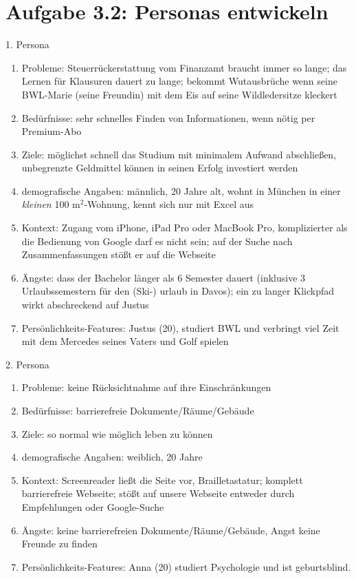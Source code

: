 \documentclass{article}
\begin{document}
	\section*{Aufgabe 3.2: Personas entwickeln}
	1. Persona
	 \begin{enumerate}[label=(\alph*)]
	 	\item Probleme: Steuerrückerstattung vom Finanzamt braucht immer so lange; das Lernen für Klausuren dauert zu lange; bekommt Wutausbrüche wenn seine BWL-Marie (seine Freundin) mit dem Eis auf seine Wildledersitze kleckert
	 	\item Bedürfnisse: sehr schnelles Finden von Informationen, wenn nötig per Premium-Abo
	 	\item Ziele: möglichst schnell das Studium mit minimalem Aufwand abschließen, unbegrenzte Geldmittel können in seinen Erfolg investiert werden
	 	\item demografische Angaben: männlich, 20 Jahre alt, wohnt in München in einer \textit{kleinen} 100 m$^2$-Wohnung, kennt sich nur mit Excel aus
	 	\item Kontext: Zugang vom iPhone, iPad Pro oder MacBook Pro, komplizierter als die Bedienung von Google darf es nicht sein; auf der Suche nach Zusammenfassungen stößt er auf die Webseite
	 	\item Ängste: dass der Bachelor länger als 6 Semester dauert (inklusive 3 Urlaubssemestern für den (Ski-) urlaub in Davos); ein zu langer Klickpfad wirkt abschreckend auf Justus
	 	\item Persönlichkeits-Features: Justus (20), studiert BWL und verbringt viel Zeit mit dem Mercedes seines Vaters und Golf spielen
	 \end{enumerate}
 	2. Persona
 	\begin{enumerate}[label=(\alph*)]
 		\item Probleme: keine Rücksichtnahme auf ihre Einschränkungen
 		\item Bedürfnisse: barrierefreie Dokumente/Räume/Gebäude
 		\item Ziele: so normal wie möglich leben zu können
 		\item demografische Angaben: weiblich, 20 Jahre
 		\item Kontext: Screenreader ließt die Seite vor, Brailletastatur; komplett barrierefreie Webseite; stößt auf unsere Webseite entweder durch Empfehlungen oder Google-Suche
 		\item Ängste: keine barrierefreien Dokumente/Räume/Gebäude, Angst keine Freunde zu finden
 		\item Persönlichkeits-Features: Anna (20) studiert Psychologie und ist geburtsblind.
 	\end{enumerate}
	
\end{document}
